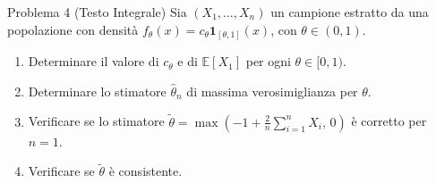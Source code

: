 \documentclass[11pt,a4paper]{article}
\newcommand{\EE}{\mathbb{E}}
\begin{document}
\begin{problemabox}{Problema 4 (Testo Integrale)}
Sia $(X_1,\dots,X_n)$ un campione estratto da una popolazione con densità $f_\theta(x) = c_\theta \mathbf{1}_{[\theta,1]}(x)$, con $\theta \in (0,1)$.
\begin{enumerate}[label=(\alph*)]
    \item Determinare il valore di $c_\theta$ e di $\EE[X_1]$ per ogni $\theta \in [0,1)$.
    \item Determinare lo stimatore $\widehat{\theta}_n$ di massima verosimiglianza per $\theta$.
    \item Verificare se lo stimatore $\widetilde{\theta} = \max\left(-1 + \frac{2}{n}\sum_{i=1}^n X_i, \, 0\right)$ è corretto per $n=1$.
    \item Verificare se $\widetilde{\theta}$ è consistente.
\end{enumerate}
\end{problemabox}
\end{document}
